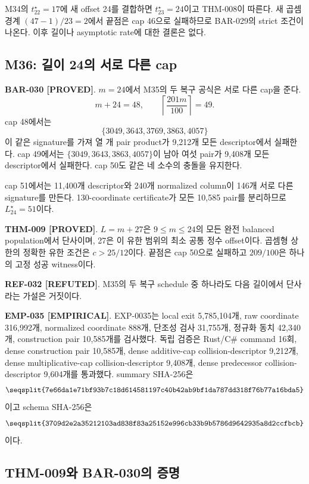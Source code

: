 \documentclass[11pt]{article}
\newcommand{\claimstatus}[2]{\textbf{#1 [#2]}}
\begin{document}
M34의 \(t_{22}^\star=17\)에 새 offset 24를 결합하면
\(t_{23}^\star=24\)이고 THM-008이 따른다. 새 곱셈 경계
\((47-1)/23=2\)에서 끝점은 cap 46으로 실패하므로 BAR-029의 strict
조건이 나온다. 이후 길이나 asymptotic rate에 대한 결론은 없다.

\subsection{M36: 길이 24의 서로 다른 cap}

\claimstatus{BAR-030}{PROVED}.
\(m=24\)에서 M35의 두 복구 공식은 서로 다른 cap을 준다.
\[
m+24=48,\qquad
\left\lceil\frac{201m}{100}\right\rceil=49.
\]
cap 48에서는
\[
\{3049,3643,3769,3863,4057\}
\]
이 같은 signature를 가져 열 개 pair product가 9,212개 모든
descriptor에서 실패한다. cap 49에서는
\(\{3049,3643,3863,4057\}\)이 남아 여섯 pair가 9,408개 모든
descriptor에서 실패한다. cap 50도 같은 네 소수의 충돌을 유지한다.

cap 51에서는 11,400개 descriptor와 240개 normalized column이 146개
서로 다른 signature를 만든다. 130-coordinate certificate가 모든
10,585 pair를 분리하므로 \(L_{24}^\star=51\)이다.

\claimstatus{THM-009}{PROVED}.
\(L=m+27\)은 \(9\le m\le24\)의 모든 완전 balanced population에서
단사이며, 27은 이 유한 범위의 최소 공통 정수 offset이다. 곱셈형
상한의 정확한 유한 조건은 \(c>25/12\)이다. 끝점은 cap 50으로
실패하고 \(209/100\)은 하나의 고정 성공 witness이다.

\claimstatus{REF-032}{REFUTED}.
M35의 두 복구 schedule 중 하나라도 다음 길이에서 단사라는 가설은
거짓이다.

\claimstatus{EMP-035}{EMPIRICAL}.
EXP-0035는 local exit 5,785,104개, raw coordinate 316,992개,
normalized coordinate 888개, 단조성 검사 31,755개, 정규화 동치
42,340개, construction pair 10,585개를 검사했다. 독립 검증은
Rust/C\# command 16회, dense construction pair 10,585개, dense
additive-cap collision-descriptor 9,212개, dense multiplicative-cap
collision-descriptor 9,408개, dense predecessor collision-descriptor
9,604개를 통과했다. summary SHA-256은
\[
\texttt{\seqsplit{7e66da1e71bf93b7c18d614581197c40b42ab9bf1da787dd318f76b77a16bda5}}
\]
이고 schema SHA-256은
\[
\texttt{\seqsplit{3709d2e2a35212103ad838f83a25152e996cb33b9b5786d9642935a8d2ccfbcb}}
\]
이다.

\subsection{THM-009와 BAR-030의 증명}
\end{document}
